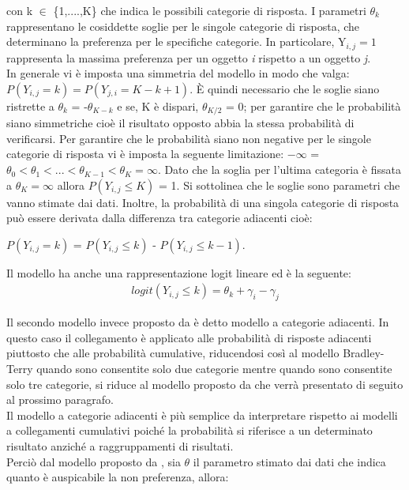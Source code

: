 con k $\in$ \{1,....,K\} che indica le possibili categorie di risposta. I parametri $\theta_{k}$ rappresentano le cosiddette soglie per le singole categorie di risposta, che determinano la preferenza per le specifiche categorie. In particolare, Y$_{i,j} = 1$ rappresenta la massima preferenza per un oggetto \textit{i} rispetto a un oggetto \textit{j}.\\
In generale vi è imposta una simmetria del modello in modo che valga: $P(Y_{i,j} = k) = P(Y_{j,i} = K - k + 1)$. È quindi necessario che le soglie siano ristrette a $\theta_{k}$ = -$\theta_{K-k}$ e se, K è dispari, $\theta_{K/2}$ = 0; per garantire che le probabilità siano simmetriche cioè il risultato opposto abbia la stessa probabilità di verificarsi. Per garantire che le probabilità siano non negative per le singole categorie di risposta vi è imposta la seguente limitazione: $-\infty$ = $\theta_{0} < \theta_{1} < ... < \theta_{K-1} < \theta_{K} = \infty$. Dato che la soglia per l'ultima categoria è fissata a $\theta_{K} = \infty$ allora $P(Y_{i,j} \leq K)$ = 1. Si sottolinea che le soglie sono parametri che vanno stimate dai dati. Inoltre, la probabilità di una singola categorie di risposta può essere derivata dalla differenza tra categorie adiacenti cioè:
\begin{center}
	  $P(Y_{i,j} = k)$ = $P(Y_{i,j} \leq k)$ - $P(Y_{i,j} \leq k - 1)$.
\end{center}

Il modello ha anche una rappresentazione logit lineare ed è la seguente:
\begin{align}
	logit(Y_{i,j}\leq k) =  \theta_{k} + \gamma_i - \gamma_j 
\end{align}

Il secondo modello invece proposto da \autocite{agresti1992analysis} è detto modello a categorie adiacenti. In questo caso il collegamento è applicato alle probabilità di risposte adiacenti piuttosto che alle probabilità cumulative, riducendosi così al modello Bradley-Terry quando sono consentite solo due categorie mentre quando sono consentite solo tre categorie, si riduce al modello proposto da \autocite{davidson1970extending} che verrà presentato di seguito al prossimo paragrafo.\\
Il modello a categorie adiacenti è più semplice da interpretare rispetto ai modelli a collegamenti cumulativi poiché la probabilità si riferisce a un determinato risultato anziché a raggruppamenti di risultati. \\
Perciò dal modello proposto da \autocite{davidson1970extending}, sia $\theta$ il parametro stimato dai dati che indica quanto è auspicabile la non preferenza, allora:

